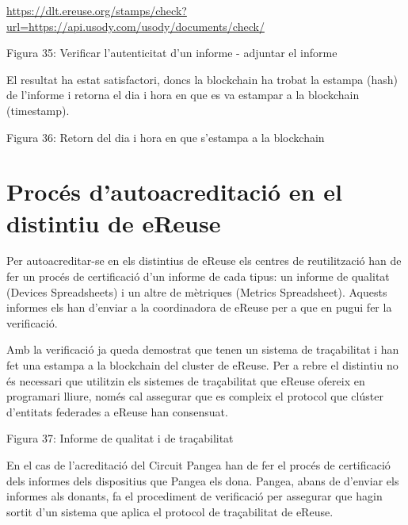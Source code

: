 \documentclass[
]{book}
\begin{document}
\url{https://dlt.ereuse.org/stamps/check?url=https://api.usody.com/usody/documents/check/}

Figura 35: Verificar l'autenticitat d'un informe - adjuntar el informe

El resultat ha estat satisfactori, doncs la blockchain ha trobat la estampa (hash) de l'informe i retorna el dia i hora en que es va estampar a la blockchain (timestamp).

Figura 36: Retorn del dia i hora en que s'estampa a la blockchain

\hypertarget{procuxe9s-dautoacreditaciuxf3-en-el-distintiu-de-ereuse}{%
\section{Procés d'autoacreditació en el distintiu de eReuse}\label{procuxe9s-dautoacreditaciuxf3-en-el-distintiu-de-ereuse}}

Per autoacreditar-se en els distintius de eReuse els centres de reutilització han de fer un procés de certificació d'un informe de cada tipus: un informe de qualitat (Devices Spreadsheets) i un altre de mètriques (Metrics Spreadsheet). Aquests informes els han d'enviar a la coordinadora de eReuse per a que en pugui fer la verificació.

Amb la verificació ja queda demostrat que tenen un sistema de traçabilitat i han fet una estampa a la blockchain del cluster de eReuse. Per a rebre el distintiu no és necessari que utilitzin els sistemes de traçabilitat que eReuse ofereix en programari lliure, només cal assegurar que es compleix el protocol que clúster d'entitats federades a eReuse han consensuat.

Figura 37: Informe de qualitat i de traçabilitat

En el cas de l'acreditació del Circuit Pangea han de fer el procés de certificació dels informes dels dispositius que Pangea els dona. Pangea, abans de d'enviar els informes als donants, fa el procediment de verificació per assegurar que hagin sortit d'un sistema que aplica el protocol de traçabilitat de eReuse.

  
\end{document}
